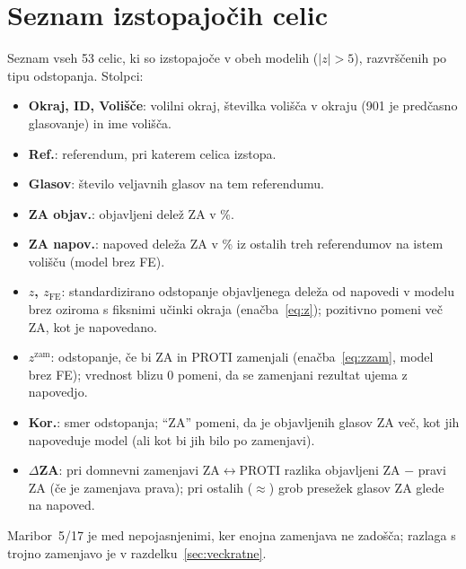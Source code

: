 \documentclass[11pt,a4paper]{article}
\begin{document}
\appendix
\section{Seznam izstopajočih celic}

Seznam vseh 53 celic, ki so izstopajoče v obeh modelih ($|z|>5$), razvrščenih po tipu odstopanja. Stolpci:
\begin{itemize}\setlength{\itemsep}{0pt}
\item \textbf{Okraj, ID, Volišče}: volilni okraj, številka volišča v okraju (901 je predčasno glasovanje) in ime volišča.
\item \textbf{Ref.}: referendum, pri katerem celica izstopa.
\item \textbf{Glasov}: število veljavnih glasov na tem referendumu.
\item \textbf{ZA objav.}: objavljeni delež ZA v \%.
\item \textbf{ZA napov.}: napoved deleža ZA v \% iz ostalih treh referendumov na istem volišču (model brez FE).
\item \textbf{$z$, $z_{\text{FE}}$}: standardizirano odstopanje objavljenega deleža od napovedi v modelu brez oziroma s fiksnimi učinki okraja (enačba~\ref{eq:z}); pozitivno pomeni več ZA, kot je napovedano.
\item \textbf{$z^{\text{zam}}$}: odstopanje, če bi ZA in PROTI zamenjali (enačba~\ref{eq:zzam}, model brez FE); vrednost blizu 0 pomeni, da se zamenjani rezultat ujema z napovedjo.
\item \textbf{Kor.}: smer odstopanja; ``ZA'' pomeni, da je objavljenih glasov ZA več, kot jih napoveduje model (ali kot bi jih bilo po zamenjavi).
\item \textbf{$\Delta$ZA}: pri domnevni zamenjavi ZA$\leftrightarrow$PROTI razlika objavljeni ZA $-$ pravi ZA (če je zamenjava prava); pri ostalih ($\approx$) grob presežek glasov ZA glede na napoved.
\end{itemize}
Maribor~5/17 je med nepojasnjenimi, ker enojna zamenjava ne zadošča; razlaga s trojno zamenjavo je v razdelku~\ref{sec:veckratne}.
\end{document}
